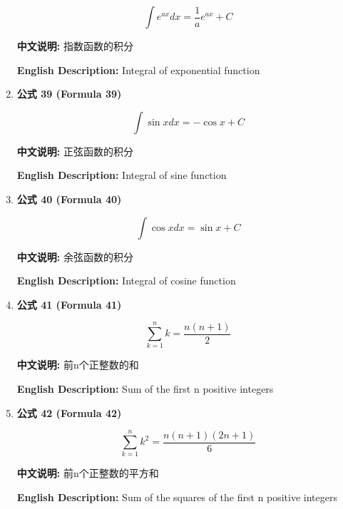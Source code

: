 \documentclass[12pt,a4paper]{article}
\begin{document}
\begin{enumerate}[leftmargin=*]
\begin{equation}
\int e^{ax} dx = \frac{1}{a}e^{ax} + C
\end{equation}

\textbf{中文说明:} 指数函数的积分

\textbf{English Description:} Integral of exponential function

\vspace{0.5cm}

\item \textbf{公式 39 (Formula 39)}

\begin{equation}
\int \sin x dx = -\cos x + C
\end{equation}

\textbf{中文说明:} 正弦函数的积分

\textbf{English Description:} Integral of sine function

\vspace{0.5cm}

\item \textbf{公式 40 (Formula 40)}

\begin{equation}
\int \cos x dx = \sin x + C
\end{equation}

\textbf{中文说明:} 余弦函数的积分

\textbf{English Description:} Integral of cosine function

\vspace{0.5cm}

\item \textbf{公式 41 (Formula 41)}

\begin{equation}
\sum_{k=1}^{n} k = \frac{n(n+1)}{2}
\end{equation}

\textbf{中文说明:} 前n个正整数的和

\textbf{English Description:} Sum of the first n positive integers

\vspace{0.5cm}

\item \textbf{公式 42 (Formula 42)}

\begin{equation}
\sum_{k=1}^{n} k^2 = \frac{n(n+1)(2n+1)}{6}
\end{equation}

\textbf{中文说明:} 前n个正整数的平方和

\textbf{English Description:} Sum of the squares of the first n positive integers


\end{enumerate}
\end{document}
